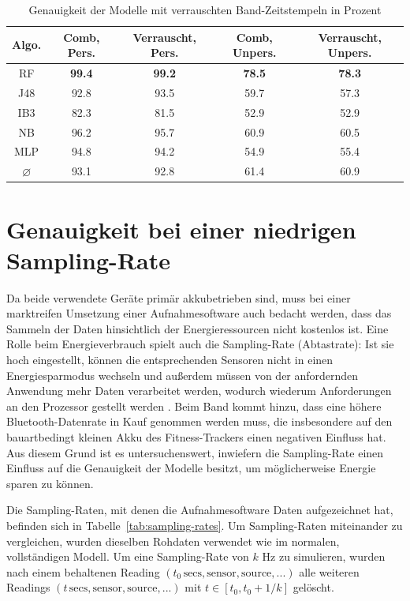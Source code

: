 \begin{table}
\centering
\begin{tabular}{|c|c|c||c|c|}
	\hline 
	\textbf{Algo.} & \textbf{Comb, Pers.} & \textbf{Verrauscht, Pers.} &\textbf{Comb, Unpers.} & \textbf{Verrauscht, Unpers.} \\ 
	\hline 
	RF & \textbf{99.4} & \textbf{99.2} & \textbf{78.5} & \textbf{78.3} \\ 
	J48 & 92.8 & 93.5 & 59.7 & 57.3 \\ 
	IB3 & 82.3 & 81.5 & 52.9 & 52.9 \\ 
	NB & 96.2 & 95.7 & 60.9 & 60.5 \\ 
	MLP & 94.8 & 94.2 & 54.9 & 55.4 \\ 
	\hline 
	$\varnothing$ & 93.1 & 92.8 & 61.4 & 60.9 \\ 
	\hline
\end{tabular} 
\caption{Genauigkeit der Modelle mit verrauschten Band-Zeitstempeln in Prozent}
\label{tab:accuracy-noisy_timestamps}
\end{table}

\section{Genauigkeit bei einer niedrigen Sampling-Rate}
\label{sec:lower-sampling-rate}
Da beide verwendete Geräte primär akkubetrieben sind, muss bei einer marktreifen Umsetzung einer Aufnahmesoftware auch bedacht werden, dass das Sammeln der Daten hinsichtlich der Energieressourcen nicht kostenlos ist. Eine Rolle beim Energieverbrauch spielt auch die Sampling-Rate (Abtastrate): Ist sie hoch eingestellt, können die entsprechenden Sensoren nicht in einen Energiesparmodus wechseln und außerdem müssen von der anfordernden Anwendung mehr Daten verarbeitet werden, wodurch wiederum Anforderungen an den Prozessor gestellt werden \cite{Krause2005}. Beim Band kommt hinzu, dass eine höhere Bluetooth-Datenrate in Kauf genommen werden muss, die insbesondere auf den bauartbedingt kleinen Akku des Fitness-Trackers einen negativen Einfluss hat. Aus diesem Grund ist es untersuchenswert, inwiefern die Sampling-Rate einen Einfluss auf die Genauigkeit der Modelle besitzt, um möglicherweise Energie sparen zu können.

Die Sampling-Raten, mit denen die Aufnahmesoftware Daten aufgezeichnet hat, befinden sich in Tabelle~\ref{tab:sampling-rates}. Um Sampling-Raten miteinander zu vergleichen, wurden dieselben Rohdaten verwendet wie im normalen, vollständigen Modell. Um eine Sampling-Rate von $k$ Hz zu simulieren, wurden nach einem behaltenen Reading $(t_0\,\text{secs}, \text{sensor}, \text{source}, ...)$ alle weiteren Readings $(t\,\text{secs}, \text{sensor}, \text{source}, ...)$ mit $t \in [t_0, t_0 + 1/k]$ gelöscht.

